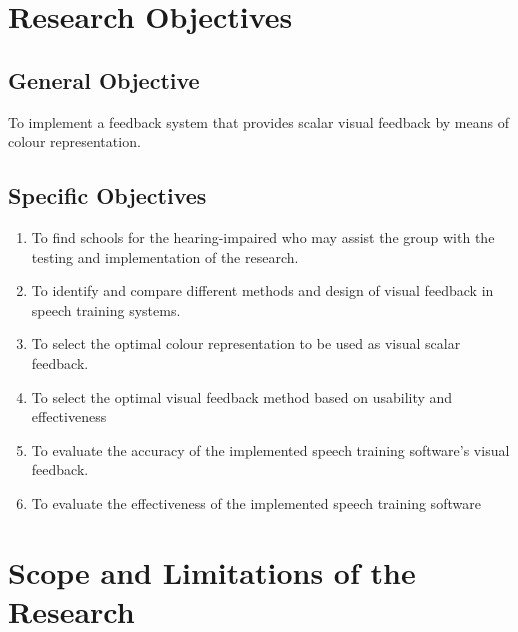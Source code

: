 \section{Research Objectives}
\label{sec:researchobjectives}

\subsection{General Objective}
\label{sec:generalobjective}

\begin{comment}
To implement a speech training software that provides visual feedback to assist people with hearing impairment in order to learn how to speak vowel sounds.
\end{comment}

To implement a feedback system that provides scalar visual feedback by means of colour representation.

\subsection{Specific Objectives}
\label{sec:specificobjectives}

\begin{enumerate}
\item To find schools for the hearing-impaired who may assist the group with the testing and implementation of the research.
\item To identify and compare different methods and design of visual feedback in speech training systems.
\item To select the optimal colour representation to be used as visual scalar feedback.
\item To select the optimal visual feedback method based on usability and effectiveness
\item To evaluate the accuracy of the implemented speech training software’s visual feedback.
\item To evaluate the effectiveness of the implemented speech training software
\end{enumerate}

\section{Scope and Limitations of the Research}
\label{sec:scopelimitations}

